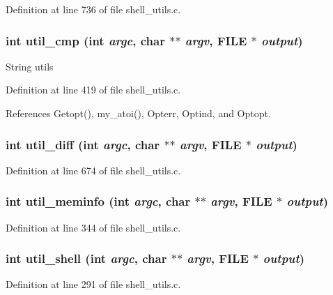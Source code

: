 Definition at line 736 of file shell\_\-utils.c.
\subsubsection{\setlength{\rightskip}{0pt plus 5cm}int util\_\-cmp (int {\em argc}, char $\ast$$\ast$ {\em argv}, FILE $\ast$ {\em output})}\label{shell__utils_8c_a7}


String utils 

Definition at line 419 of file shell\_\-utils.c.

References Getopt(), my\_\-atoi(), Opterr, Optind, and Optopt.
\subsubsection{\setlength{\rightskip}{0pt plus 5cm}int util\_\-diff (int {\em argc}, char $\ast$$\ast$ {\em argv}, FILE $\ast$ {\em output})}\label{shell__utils_8c_a9}




Definition at line 674 of file shell\_\-utils.c.
\subsubsection{\setlength{\rightskip}{0pt plus 5cm}int util\_\-meminfo (int {\em argc}, char $\ast$$\ast$ {\em argv}, FILE $\ast$ {\em output})}\label{shell__utils_8c_a6}




Definition at line 344 of file shell\_\-utils.c.
\subsubsection{\setlength{\rightskip}{0pt plus 5cm}int util\_\-shell (int {\em argc}, char $\ast$$\ast$ {\em argv}, FILE $\ast$ {\em output})}\label{shell__utils_8c_a5}




Definition at line 291 of file shell\_\-utils.c.
